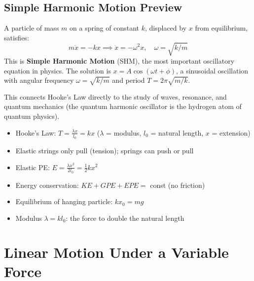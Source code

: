 \documentclass[12pt, a4paper]{book}
\begin{document}
\section{Simple Harmonic Motion Preview}

\begin{explorationbox}
A particle of mass $m$ on a spring of constant $k$, displaced by $x$ from equilibrium, satisfies:
\[
  m\ddot{x} = -kx \implies \ddot{x} = -\omega^2 x, \quad \omega = \sqrt{k/m}
\]
This is \textbf{Simple Harmonic Motion} (SHM), the most important oscillatory equation in physics. The solution is $x = A\cos(\omega t + \phi)$, a sinusoidal oscillation with angular frequency $\omega = \sqrt{k/m}$ and period $T = 2\pi\sqrt{m/k}$.

This connects Hooke's Law directly to the study of waves, resonance, and quantum mechanics (the quantum harmonic oscillator is the hydrogen atom of quantum physics).
\end{explorationbox}

\begin{summarybox}
\begin{itemize}[leftmargin=1.5em]
  \item Hooke's Law: $T = \frac{\lambda x}{l_0} = kx$ ($\lambda$ = modulus, $l_0$ = natural length, $x$ = extension)
  \item Elastic strings only pull (tension); springs can push or pull
  \item Elastic PE: $E = \frac{\lambda x^2}{2l_0} = \frac{1}{2}kx^2$
  \item Energy conservation: $KE + GPE + EPE = $ const (no friction)
  \item Equilibrium of hanging particle: $kx_0 = mg$
  \item Modulus $\lambda = kl_0$: the force to double the natural length
\end{itemize}
\end{summarybox}

\chapter{Linear Motion Under a Variable Force}
\end{document}
